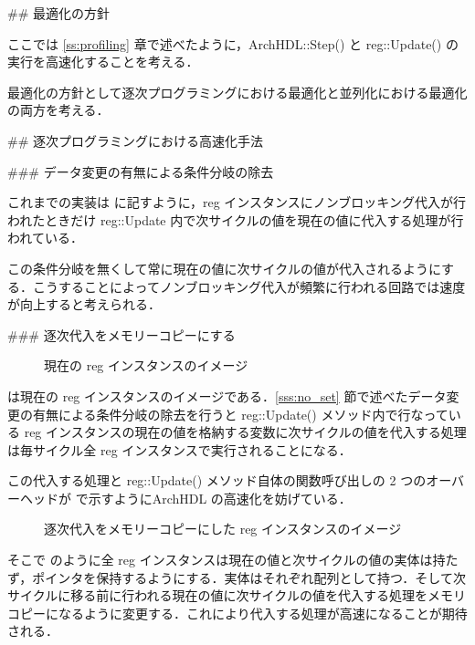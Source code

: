 ## 最適化の方針

ここでは \ref{ss:profiling} 章で述べたように，ArchHDL::Step() と reg::Update() の実行を高速化することを考える．

最適化の方針として逐次プログラミングにおける最適化と並列化における最適化の両方を考える．


## 逐次プログラミングにおける高速化手法

### データ変更の有無による条件分岐の除去 \label{sss:no_set}

これまでの実装は  に記すように，reg インスタンスにノンブロッキング代入が行われたときだけ reg::Update 内で次サイクルの値を現在の値に代入する処理が行われている．

この条件分岐を無くして常に現在の値に次サイクルの値が代入されるようにする．こうすることによってノンブロッキング代入が頻繁に行われる回路では速度が向上すると考えられる．


### 逐次代入をメモリーコピーにする \label{sss:mem_copy}

\begin{figure}[t]
 \begin{center}
  
 \end{center}
 \caption{現在の reg インスタンスのイメージ}
 \label{fig:regs}
\end{figure}

 は現在の reg インスタンスのイメージである．\ref{sss:no_set} 節で述べたデータ変更の有無による条件分岐の除去を行うと reg::Update() メソッド内で行なっている reg インスタンスの現在の値を格納する変数に次サイクルの値を代入する処理は毎サイクル全 reg インスタンスで実行されることになる．

この代入する処理と reg::Update() メソッド自体の関数呼び出しの
2 つのオーバーヘッドが で示すようにArchHDL の高速化を妨げている．

\begin{figure}[t]
 \begin{center}
  
 \end{center}
 \caption{逐次代入をメモリーコピーにした reg インスタンスのイメージ}
 \label{fig:mem_copy}
\end{figure}


そこで のように全 reg インスタンスは現在の値と次サイクルの値の実体は持たず，ポインタを保持するようにする．実体はそれぞれ配列として持つ．そして次サイクルに移る前に行われる現在の値に次サイクルの値を代入する処理をメモリコピーになるように変更する．これにより代入する処理が高速になることが期待される．

